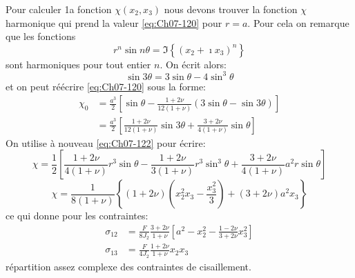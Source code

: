 Pour calculer 1a fonction $\chi (x_2,x_3)$ nous devons trouver la fonction $\chi$ harmonique qui prend la valeur \eqref{eq:Ch07-120} pour $r=a$.
Pour cela on remarque que les fonctions
\begin{equation}
    r^n \sin n \theta = \Im \left\{ \left( x_2 + \imath x_3 \right)^n \right\}
    \label{eq:Ch07-121}
\end{equation}
sont harmoniques pour tout entier $n$.
On écrit alors: 
\begin{equation}
    \sin 3 \theta = 3 \sin \theta - 4 \sin^3 \theta
    \label{eq:Ch07-122}
\end{equation}
et on peut réécrire \eqref{eq:Ch07-120} sous la forme: 
\begin{equation}
    \begin{aligned}
        \chi_0 &= \frac{a^3}{2} \left[ \sin \theta - \frac{1+2\nu}{12 (1+\nu)} \left( 3 \sin \theta - \sin 3 \theta \right) \right] \\
        &= \frac{a^3}{2} \left[ \frac{1+2\nu}{12(1+\nu)} \sin 3 \theta + \frac{3 + 2\nu}{4(1+\nu)} \sin \theta \right]
    \end{aligned}
    \label{eq:Ch07-123}
\end{equation}
On utilise à nouveau \eqref{eq:Ch07-122} pour écrire:
\begin{displaymath}
    \chi = \frac{1}{2} \left[ \frac{1+2\nu}{4(1+\nu)} r^3 \sin \theta - \frac{1+2\nu}{3(1+\nu)} r^3 \sin^3 \theta + \frac{3+2\nu}{4(1+\nu)}a^2 r \sin \theta \right]
\end{displaymath}
\begin{equation}
    \chi = \frac{1}{8(1+\nu)} \left\{ (1+2\nu) \left( x_2^2 x_3 - \frac{x_3^2}{3}\right) + (3+2\nu) a^2 x_3 \right\}
    \label{eq:Ch07-124}
\end{equation}
ce qui donne pour les contraintes: 
\begin{equation}
    \begin{aligned}
        \sigma_{12} &= \frac{F}{8J_2} \frac{3+2\nu}{1+\nu} \left[ a^2 - x_2^2 - \frac{1-2\nu}{3+ 2\nu}x_3^2 \right] \\
        \sigma_{13} &= \frac{F}{4J_2} \frac{1+2\nu}{1+\nu} x_2 x_3
    \end{aligned}
    \label{eq:Ch07-125}
\end{equation}
répartition assez complexe des contraintes de cisaillement. 

